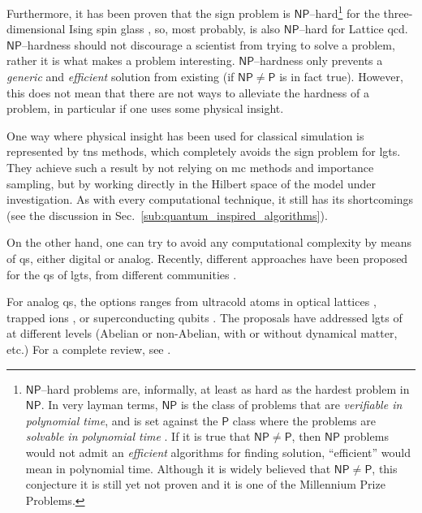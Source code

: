Furthermore, it has been proven that the sign problem is $\mathsf{NP}$--hard\footnote{
    $\mathsf{NP}$--hard problems are, informally, at least as hard as the hardest problem in $\mathsf{NP}$.
    In very layman terms, $\mathsf{NP}$ is the class of problems that are \emph{verifiable in polynomial time}, and is set against the $\mathsf{P}$ class where the problems are \emph{solvable in polynomial time} \cite{arora2009computational}.
    If it is true that $\mathsf{NP} \neq \mathsf{P}$, then $\mathsf{NP}$ problems would not admit an \emph{efficient} algorithms for finding solution, ``efficient'' would mean in polynomial time.
    Although it is widely believed that $\mathsf{NP} \neq \mathsf{P}$, this conjecture it is still yet not proven and it is one of the Millennium Prize Problems.
}
for the three-dimensional Ising spin glass \cite{troyer2005fermionioc}, so, most probably, is also $\mathsf{NP}$--hard for Lattice \ac{qcd}.
$\mathsf{NP}$--hardness should not discourage a scientist from trying to solve a problem, rather it is what makes a problem interesting.
$\mathsf{NP}$--hardness only prevents a \emph{generic} and \emph{efficient} solution from existing (if $\mathsf{NP} \neq \mathsf{P}$ is in fact true).
However, this does not mean that there are not ways to alleviate the hardness of a problem, in particular if one uses some physical insight.

One way where physical insight has been used for classical simulation is represented by \acp{tn} methods, which completely avoids the sign problem for \acp{lgt}.
They achieve such a result by not relying on \ac{mc} methods and importance sampling, but by working directly in the Hilbert space of the model under investigation.
As with every computational technique, it still has its shortcomings (see the discussion in Sec.~\ref{sub:quantum_inspired_algorithms}).

\medskip

On the other hand, one can try to avoid any computational complexity by means of \ac{qs}, either digital or analog.
Recently, different approaches have been proposed for the \ac{qs} of \acp{lgt}, from different communities \cite{banuls2020lgtreview, dalmonte2016lgtreview, banuls2020simulating}.

For analog \ac{qs}, the options ranges from ultracold atoms in optical lattices \cite{wiese2013ultracold, zohar2013ultracold, zohar2015quantum, zohar2011qed, banerjee2012atomic}, trapped ions \cite{hauke2013trappedions, yang2016trappedions}, or superconducting qubits \cite{marcos2013sclgt, marcos2014sclgt2d, brennen2016lgt}.
The proposals have addressed \acp{lgt} of at different levels (Abelian or non-Abelian, with or without dynamical matter, etc.)
For a complete review, see \cite{banuls2020simulating, banuls2020lgtreview, dalmonte2016lgtreview}.

